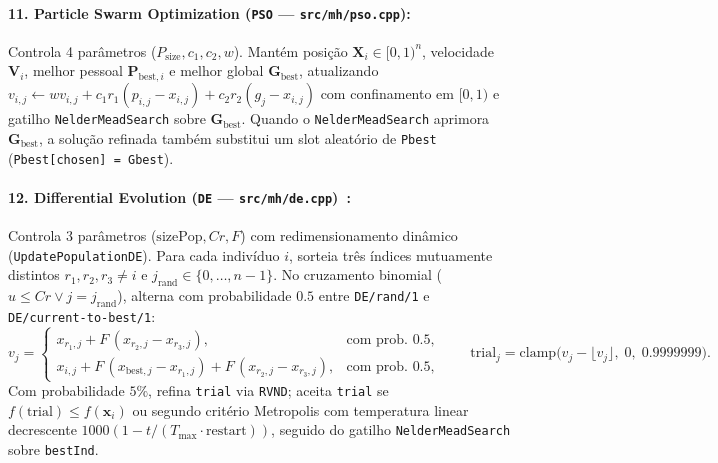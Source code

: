 \documentclass[11pt,a4paper]{article}
\begin{document}
\paragraph{11. Particle Swarm Optimization (\texttt{PSO} --- \texttt{src/mh/pso.cpp}):}
Controla 4 parâmetros ($P_{\text{size}}, c_1, c_2, w$). Mantém posição $\mathbf{X}_i \in [0,1)^n$, velocidade $\mathbf{V}_i$, melhor pessoal $\mathbf{P}_{\text{best},i}$ e melhor global $\mathbf{G}_{\text{best}}$, atualizando $v_{i,j} \leftarrow w v_{i,j} + c_1 r_1 (p_{i,j} - x_{i,j}) + c_2 r_2 (g_j - x_{i,j})$ com confinamento em $[0,1)$ e gatilho \texttt{NelderMeadSearch} sobre $\mathbf{G}_{\text{best}}$. Quando o \texttt{NelderMeadSearch} aprimora $\mathbf{G}_{\text{best}}$, a solução refinada também substitui um slot aleatório de \texttt{Pbest} (\texttt{Pbest[chosen] = Gbest}).

\paragraph{12. Differential Evolution (\texttt{DE} --- \texttt{src/mh/de.cpp})~\cite{storn1997de}:}
Controla 3 parâmetros ($\text{sizePop}, Cr, F$) com redimensionamento dinâmico (\texttt{UpdatePopulationDE}). Para cada indivíduo $i$, sorteia três índices mutuamente distintos $r_1, r_2, r_3 \ne i$ e $j_{\text{rand}} \in \{0, \dots, n-1\}$. No cruzamento binomial ($u \le Cr \lor j = j_{\text{rand}}$), alterna com probabilidade $0.5$ entre \texttt{DE/rand/1} e \texttt{DE/current-to-best/1}:
\begin{equation}
  v_j =
  \begin{cases}
    x_{r_1,j} + F\,(x_{r_2,j} - x_{r_3,j}), & \text{com prob. } 0.5, \\[4pt]
    x_{i,j} + F\,(x_{\text{best},j} - x_{r_1,j}) + F\,(x_{r_2,j} - x_{r_3,j}), & \text{com prob. } 0.5,
  \end{cases}
  \qquad
  \text{trial}_j = \text{clamp}\big(v_j - \lfloor v_j \rfloor,\; 0,\; 0.9999999\big).
  \label{eq:de_mut}
\end{equation}
Com probabilidade $5\%$, refina \texttt{trial} via \texttt{RVND}; aceita \texttt{trial} se $f(\text{trial}) \le f(\mathbf{x}_i)$ ou segundo critério Metropolis com temperatura linear decrescente $1000(1 - t/(T_{\max}\cdot\text{restart}))$, seguido do gatilho \texttt{NelderMeadSearch} sobre \texttt{bestInd}.
\end{document}
